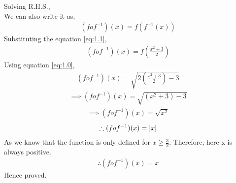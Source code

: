 \documentclass[journal,12pt,twocolumn]{IEEEtran}
\begin{document}
\begin{itemize}
	Solving R.H.S.,\\
	We can also write it as,
	\begin{align}
	(fof^{-1})(x) = f(f^{-1}(x))
	\end{align}
	Substituting the equation \eqref{eq:1.1},
	\begin{align}
	(fof^{-1})(x) = f(\frac{x^{2} + 3}{2})
	\end{align}
	Using equation \eqref{eq:1.0},
	\begin{align}
	(fof^{-1})(x) = \sqrt{2(\frac{x^{2} + 3}{2}) - 3}
	\end{align}
	\begin{align}
	\implies(fof^{-1})(x) = \sqrt{(x^{2} + 3) - 3}
	\end{align}
	\begin{align}
	\implies(fof^{-1})(x) = \sqrt{x^{2}}
	\end{align}
	\begin{align}
	\therefore(fof^{-1})(x) = \left\vert x\right\vert
	\end{align}
	As we know that the function is only defined for $x \geq \frac{3}{2}$. Therefore, here x is always positive.
	\begin{align}
	\therefore(fof^{-1})(x) = x
	\end{align}
	Hence proved.
	\end{itemize}
\end{document}
